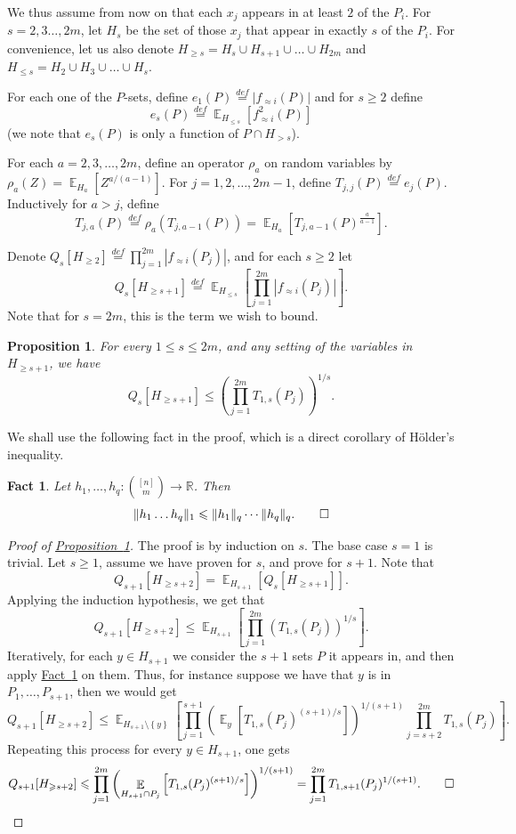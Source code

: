 \documentclass[11pt]{article}
\newcommand{\expref}[2]{\texorpdfstring{\hyperref[#2]{#1~\ref{#2}}}{#1~\ref{#2}}}
\newtheorem{proposition}[theorem]{Proposition}
\newtheorem{fact}[theorem]{Fact}
\newcommand\card[1]{\left| {#1} \right|}
\newcommand\set[1]{{\left\{ #1 \right\}}}
\newcommand\Expect[2]{{\mathop{\mathbb{E}}_{#1}\left[ {#2} \right]}}
\newcommand\norm[1]{\| #1 \|}
\newcommand\defeq{\stackrel{def}{=}}
\renewcommand\geq{\geqslant}
\renewcommand\leq{\leqslant}
\newcommand\approxlvlfn[2]{{#1}_{\approx{#2}}}
\begin{document}
We thus assume from now on that each $x_j$ appears in at least $2$ of the
%
$P_i$.   %
For $s=2,3\ldots,2m$, let $H_s$ be the set of %
those $x_j$   %
that appear in exactly $s$ of the %
$P_i$.   %
For convenience, let us also denote $H_{\geq s} = H_s\cup H_{s+1}\cup\ldots\cup H_{2m}$ and
$H_{\leq s} = H_2\cup H_{3}\cup\ldots\cup H_{s}$.

For each one of the $P$-sets, define
$e_1(P) \defeq \card{\approxlvlfn{f}{i}(P)}$ and for $s\geq 2$ define
\[
e_{s}(P) \defeq \Expect{H_{\leq s}}{\approxlvlfn{f}{i}^2(P)}
\]
(we note that $e_s(P)$ is only a function of $P\cap H_{>s}$).

For each $a=2,3,\ldots, 2m$, define an operator $\rho_a$ on random variables by $\rho_a(Z) = \Expect{H_a}{Z^{a/(a-1)}}$.
For $j=1,2,\ldots, 2m-1$, define $T_{j,j}(P) \defeq e_j(P)$.
Inductively for $a>j$, define
\[
T_{j,a}(P) \defeq
\rho_a( T_{j,a-1}(P))
=
\Expect{H_a}{T_{j,a-1}(P)^{\frac{a}{a-1}}}.
\]

Denote $Q_s[ H_{\geq 2}] \defeq
\prod\limits_{j=1}^{2m}{\card{\approxlvlfn{f}{i}(P_j)}}$, and for each $s\geq 2$ let
\[
Q_s[ H_{\geq s+1}] \defeq \Expect{H_{\leq s}}{
\prod\limits_{j=1}^{2m}{\card{\approxlvlfn{f}{i}(P_j)}}}.
\]
Note that for $s=2m$, this is the term we wish to bound.

\begin{proposition}\label{prop:induct}
For every $1\leq s\leq 2m$, and any setting of the variables in $H_{\geq s+1}$, we have
\[
Q_s[H_{\geq s+1}]
\leq \left(\prod\limits_{j=1}^{2m}{T_{1,s}(P_j)}\right)^{1/s}.
\]
\end{proposition}
We shall use the following fact in the proof, which is a direct corollary of H\"{o}lder's inequality.
\begin{fact}\label{fact:holder}
Let $h_1,\ldots,h_q\colon \binom{[n]}{m}\to \mathbb{R}$. Then
\[
\norm{h_1\dots h_q}_1 \leq \norm{h_1}_q\cdots \norm{h_q}_q.
\qedhere
\]
\end{fact}
\begin{proof}[Proof of \expref{Proposition}{prop:induct}]
The proof is by induction on $s$.
The base case $s=1$ is trivial. Let $s\geq 1$, assume we have proven for $s$, and prove for $s+1$.
Note that
\[
Q_{s+1}[H_{\geq s+2}]
=\Expect{H_{s+1}}{Q_s[H_{\geq s+1}]}.
\]
Applying the induction hypothesis, we get that
\[
Q_{s+1}[H_{\geq s+2}]
\leq \Expect{H_{s+1}}{\prod\limits_{j=1}^{2m}{\left(T_{1,s}(P_j)\right)^{1/s}}}.
\]
Iteratively, for each $y\in H_{s+1}$ we consider the $s+1$
%
sets $P$   %
it appears in,
and then apply \expref{Fact}{fact:holder} on them. Thus, for instance suppose we have that $y$ is in $P_1,\ldots, P_{s+1}$, then we would get
\[
Q_{s+1}[H_{\geq s+2}]
\leq \Expect{H_{s+1}\setminus \set{y}}{
\prod\limits_{j=1}^{s+1}{\left(\Expect{y}{T_{1,s}(P_j)^{(s+1)/s}}\right)^{1/(s+1)}}
\prod\limits_{j=s+2}^{2m}{T_{1,s}(P_j)}}.
\]
Repeating this process for every $y\in H_{s+1}$, one gets
\[
Q_{s+1}[H_{\geq s+2}]
\leq
\prod\limits_{j=1}^{2m}{\left(\Expect{H_{s+1}\cap P_j}{T_{1,s}(P_j)^{(s+1)/s}}\right)^{1/(s+1)}}
=\prod\limits_{j=1}^{2m}{T_{1,s+1}(P_j)^{1/(s+1)}}.
\qedhere %
\]
\end{proof}
\end{document}

